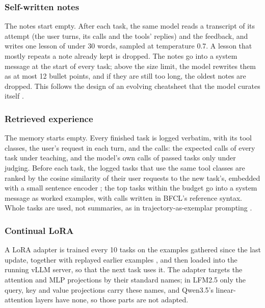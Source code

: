 \documentclass[a4paper,fleqn]{cas-dc}
\begin{document}
\subsubsection{Self-written notes}
The notes start empty. After each task, the same model reads a transcript of its attempt (the user turns, its calls and
the tools' replies) and the feedback, and writes one lesson of under 30 words, sampled at temperature 0.7. A lesson that
mostly repeats a note already kept is dropped. The notes go into a system message at the start of every task; above
the size limit, the model rewrites them as at most 12 bullet points, and if they are still too long, the oldest notes
are dropped. This follows the design of an evolving
cheatsheet that the model curates itself \citep{suzgun2026dynamic}.

\subsubsection{Retrieved experience}
The memory starts empty. Every finished task is logged verbatim, with its tool classes, the user's request in each turn,
and the calls: the expected calls of every task under teaching, and the model's own calls of passed tasks only under
judging. Before each task, the logged tasks that use the same tool classes are ranked by the cosine similarity of their
user requests to the new task's, embedded with a small sentence encoder \citep{wang2020minilm,reimers2019sentence};
the top tasks within the budget go into a system message as worked examples, with calls written in BFCL's reference
syntax. Whole tasks are used, not summaries, as in trajectory-as-exemplar prompting \citep{zheng2024synapse}.

\subsubsection{Continual LoRA}
A LoRA adapter \citep{hu2022lora} is trained every 10 tasks on the examples gathered since the last update, together
with replayed earlier examples \citep{rolnick2019experience}, and then loaded into the running vLLM server, so that the
next task uses it. The adapter targets the attention and MLP projections by their standard names; in LFM2.5 only the
query, key and value projections carry these names, and Qwen3.5's linear-attention layers have none, so those parts
are not adapted.
\end{document}
